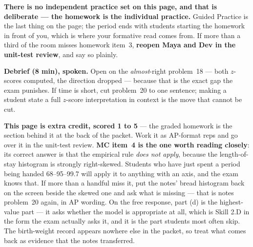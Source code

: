 \documentclass[10pt]{article}
\begin{document}
\begin{teachernote}
\textbf{There is no independent practice set on this page, and that is deliberate --- the
homework is the individual practice.} Guided Practice is the last thing on the page; the period
ends with students starting the homework in front of you, which is where your formative read
comes from. If more than a third of the room misses homework item~3, \textbf{reopen Maya and Dev
in the unit-test review}, and say so plainly.

\textbf{Debrief (8 min), spoken.} Open on the \emph{almost}-right problem~18 --- both $z$-scores
computed, the direction dropped --- because that is the exact gap the exam punishes. If time is
short, cut problem~20 to one sentence; making a student state a full $z$-score interpretation in
context is the move that cannot be cut.
\end{teachernote}

\begin{teachernote}[AP Practice]
\textbf{This page is extra credit, scored 1 to 5} --- the graded homework is the section behind it
at the back of the packet. Work it as AP-format reps and go over it in the unit-test review.
\textbf{MC item~4 is the one worth reading closely}: its correct answer is that the empirical rule
\emph{does not apply}, because the length-of-stay histogram is strongly right-skewed. Students who
have just spent a period being handed 68--95--99.7 will apply it to anything with an axis, and the
exam knows that. If more than a handful miss it, put the notes' bread histogram back on the screen
beside the skewed one and ask what is missing --- that is notes problem~20 again, in AP wording.
On the free response, part (d) is the highest-value part --- it asks whether the model is
appropriate at all, which is Skill 2.D in the form the exam actually asks it, and it is the part
students most often skip. The birth-weight record appears nowhere else in the packet, so treat
what comes back as evidence that the notes transferred.
\end{teachernote}
\end{document}
